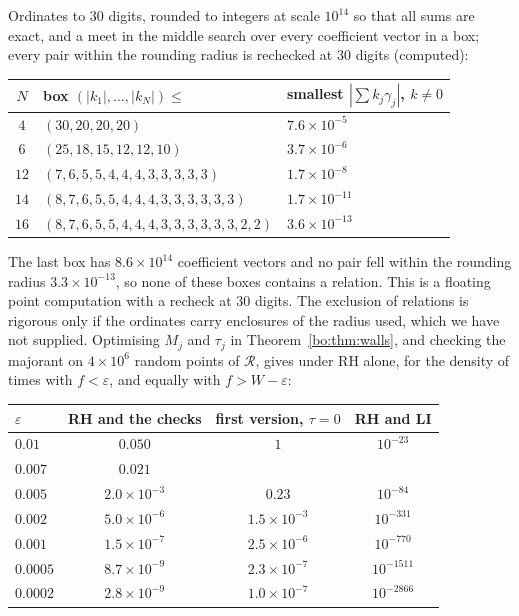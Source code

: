 \begin{computation}\label{bo:comp:walls}
Ordinates to $30$ digits, rounded to integers at scale $10^{14}$ so that all sums are exact, and a meet in the middle search over every coefficient vector in a box; every pair within the rounding radius is rechecked at $30$ digits (computed):
\begin{center}\small
\begin{tabular}{@{}cll@{}}
\toprule
$N$ & box $(|k_1|,\dots,|k_N|)\le$ & smallest $|\sum k_j\gamma_j|$, $k\ne0$\\
\midrule
$4$ & $(30,20,20,20)$ & $7.6\times10^{-5}$\\
$6$ & $(25,18,15,12,12,10)$ & $3.7\times10^{-6}$\\
$12$ & $(7,6,5,5,4,4,4,3,3,3,3,3)$ & $1.7\times10^{-8}$\\
$14$ & $(8,7,6,5,5,4,4,4,3,3,3,3,3,3)$ & $1.7\times10^{-11}$\\
$16$ & $(8,7,6,5,5,4,4,4,3,3,3,3,3,3,2,2)$ & $3.6\times10^{-13}$\\
\bottomrule
\end{tabular}
\end{center}
The last box has $8.6\times10^{14}$ coefficient vectors and no pair fell within the rounding radius $3.3\times10^{-13}$, so none of these boxes contains a relation. This is a floating point computation with a recheck at $30$ digits. The exclusion of relations is rigorous only if the ordinates carry enclosures of the radius used, which we have not supplied. Optimising $M_j$ and $\tau_j$ in Theorem~\ref{bo:thm:walls}, and checking the majorant on $4\times10^6$ random points of $\mathcal R$, gives under RH alone, for the density of times with $f<\varepsilon$, and equally with $f>W-\varepsilon$:
\begin{center}\small
\begin{tabular}{@{}lccc@{}}
\toprule
$\varepsilon$ & RH and the checks & first version, $\tau=0$ & RH and LI\\
\midrule
$0.01$ & $0.050$ & $1$ & $10^{-23}$\\
$0.007$ & $0.021$ & & \\
$0.005$ & $2.0\times10^{-3}$ & $0.23$ & $10^{-84}$\\
$0.002$ & $5.0\times10^{-6}$ & $1.5\times10^{-3}$ & $10^{-331}$\\
$0.001$ & $1.5\times10^{-7}$ & $2.5\times10^{-6}$ & $10^{-770}$\\
$0.0005$ & $8.7\times10^{-9}$ & $2.3\times10^{-7}$ & $10^{-1511}$\\
$0.0002$ & $2.8\times10^{-9}$ & $1.0\times10^{-7}$ & $10^{-2866}$\\
\bottomrule
\end{tabular}
\end{center}
\end{computation}

